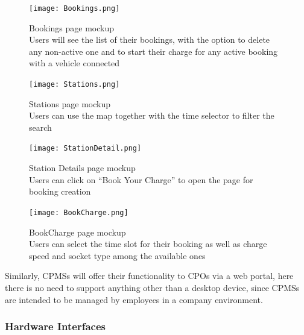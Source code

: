 \documentclass[11pt]{article}
\begin{document}
\newpage

\begin{figure}[!ht]
    \centering
    \texttt{[image: Bookings.png]}
    \captionsetup{justification=centering,margin=2cm}
    \caption{Bookings page mockup \\
    Users will see the list of their bookings, with the option to delete any non-active one and to start their charge for any active booking with a vehicle connected}
    \label{fig:my_label}
\end{figure}

\begin{figure}[!ht]
    \centering
    \texttt{[image: Stations.png]}
    \captionsetup{justification=centering,margin=2cm}
    \caption{Stations page mockup \\
    Users can use the map together with the time selector to filter the search}
    \label{fig:my_label}
\end{figure}

\newpage

\begin{figure}[!ht]
    \centering
    \texttt{[image: StationDetail.png]}
    \captionsetup{justification=centering,margin=2cm}
    \caption{Station Details page mockup \\
    Users can click on “Book Your Charge” to open the page for booking creation}
    \label{fig:my_label}
\end{figure}

\begin{figure}[!ht]
    \centering
    \texttt{[image: BookCharge.png]}
    \captionsetup{justification=centering,margin=2cm}
    \caption{BookCharge page mockup \\
    Users can select the time slot for their booking as well as charge speed and socket type among the available ones}
    \label{fig:my_label}
\end{figure}

Similarly, CPMSs will offer their functionality to CPOs via a web portal, here there is no need to support anything other than a desktop device, since CPMSs are intended to be managed by employees in a company environment.

\newpage

\subsubsection{Hardware Interfaces}
\end{document}
